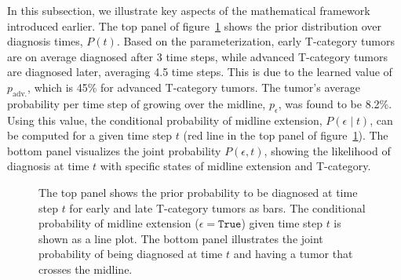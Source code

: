 \documentclass[
  sn-mathphys-num,
]{sn-jnl}
\begin{document}
In this subsection, we illustrate key aspects of the mathematical
framework introduced earlier. The top panel of
figure~\ref{fig-model-midext-evo} shows the prior distribution over
diagnosis times, \(P(t)\). Based on the parameterization, early
T-category tumors are on average diagnosed after 3 time steps, while
advanced T-category tumors are diagnosed later, averaging 4.5 time
steps. This is due to the learned value of \(p_\text{adv.}\), which is
45\% for advanced T-category tumors. The tumor's average probability per
time step of growing over the midline, \(p_\epsilon\), was found to be
8.2\%. Using this value, the conditional probability of midline
extension, \(P(\epsilon \mid t)\), can be computed for a given time step
\(t\) (red line in the top panel of figure~\ref{fig-model-midext-evo}).
The bottom panel visualizes the joint probability \(P(\epsilon, t)\),
showing the likelihood of diagnosis at time \(t\) with specific states
of midline extension and T-category.

\begin{figure}


\caption{\label{fig-model-midext-evo}The top panel shows the prior
probability to be diagnosed at time step \(t\) for early and late
T-category tumors as bars. The conditional probability of midline
extension (\(\epsilon=\texttt{True}\)) given time step \(t\) is shown as
a line plot. The bottom panel illustrates the joint probability of being
diagnosed at time \(t\) and having a tumor that crosses the midline.}

\end{figure}%
\end{document}
